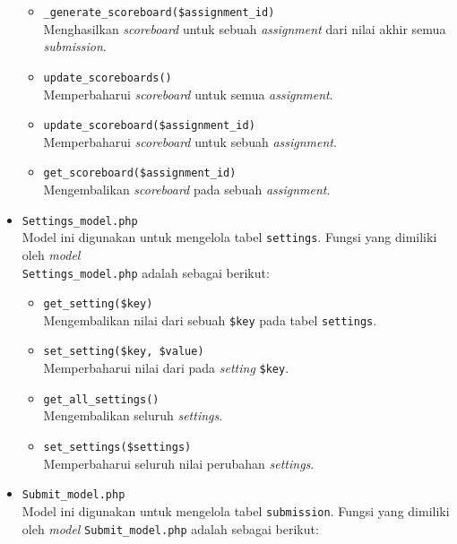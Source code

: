 \begin{itemize}
	      \begin{itemize}
		      \item \verb|_generate_scoreboard($assignment_id)| \\
		            Menghasilkan \textit{scoreboard} untuk sebuah \textit{assignment} dari nilai akhir semua \textit{submission}.
		      \item \verb|update_scoreboards()| \\
		            Memperbaharui \textit{scoreboard} untuk semua \textit{assignment}.
		      \item \verb|update_scoreboard($assignment_id)| \\
		            Memperbaharui \textit{scoreboard} untuk sebuah \textit{assignment}.
		      \item \verb|get_scoreboard($assignment_id)| \\
		            Mengembalikan \textit{scoreboard} pada sebuah \textit{assignment}.
	      \end{itemize}

	      \newpage

	\item \verb|Settings_model.php| \\
	      Model ini digunakan untuk mengelola tabel \verb|settings|. Fungsi yang dimiliki oleh \textit{model} \\\verb|Settings_model.php| adalah sebagai berikut:

	      \begin{itemize}
		      \item \verb|get_setting($key)| \\
		            Mengembalikan nilai dari sebuah \verb|$key| pada tabel \verb|settings|.
		      \item \verb|set_setting($key, $value)| \\
		            Memperbaharui nilai dari pada \textit{setting} \verb|$key|.
		      \item \verb|get_all_settings()| \\
		            Mengembalikan seluruh \textit{settings}.
		      \item \verb|set_settings($settings)| \\
		            Memperbaharui seluruh nilai perubahan \textit{settings}.
	      \end{itemize}

	\item \verb|Submit_model.php| \\
	      Model ini digunakan untuk mengelola tabel \verb|submission|. Fungsi yang dimiliki oleh \textit{model} \verb|Submit_model.php| adalah sebagai berikut:


\end{itemize}
